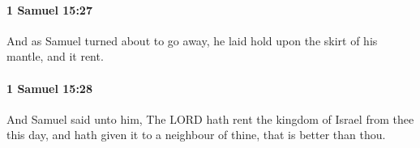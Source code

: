 		\paragraph{1 Samuel 15:27} %
			\label{1SAMUEL-15-27}

			And as Samuel turned about to go away, he laid hold upon the skirt of his mantle, and it rent.


		\paragraph{1 Samuel 15:28} %
			\label{1SAMUEL-15-28}

			And Samuel said unto him, The LORD hath rent the kingdom of Israel from thee this day, and hath given it to a neighbour of thine, that is better than thou.


